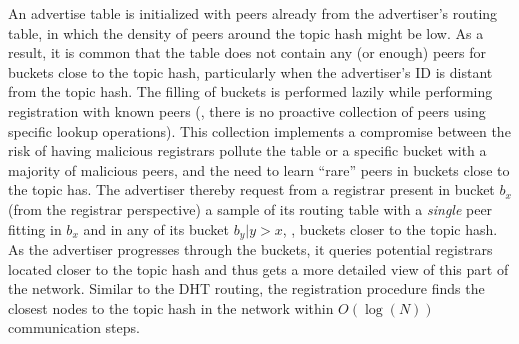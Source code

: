 
An advertise table is initialized with peers already from the advertiser's routing table, in which the density of peers around the topic hash might be low.
As a result, it is common that the table does not contain any (or enough) peers for buckets close to the topic hash, particularly when the advertiser's ID is distant from the topic hash.
The filling of buckets is performed lazily while performing registration with known peers (\ie, there is no proactive collection of peers using specific lookup operations).
This collection implements a compromise between the risk of having malicious registrars pollute the table or a specific bucket with a majority of malicious peers, and the need to learn ``rare'' peers in buckets close to the topic has.
The advertiser thereby request from a registrar present in bucket $b_x$ (from the registrar perspective) a sample of its routing table with a \emph{single} peer fitting in $b_x$ and in any of its bucket $b_{y}|y>x$, \ie, buckets closer to the topic hash.
As the advertiser progresses through the buckets, it queries potential registrars located closer to the topic hash and thus gets a more detailed view of this part of the network. 
Similar to the DHT routing, the registration procedure finds the closest nodes to the topic hash in the network within $O(\log(N))$ communication steps.


